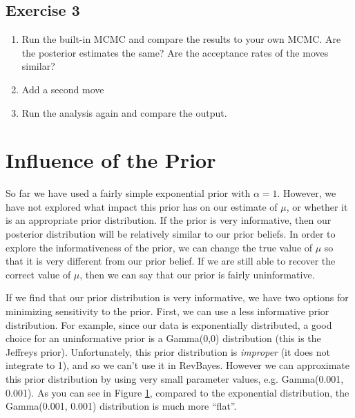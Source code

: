 \subsection{Exercise 3}

\begin{enumerate}[label=\textnormal{Step \arabic*)},leftmargin=1.5cm]
	\item Run the built-in MCMC and compare the results to your own MCMC. Are the posterior estimates the same? Are the acceptance rates of the moves similar?
	\item Add a second move 
	\item Run the analysis again and compare the output.
\end{enumerate}

\section{Influence of the Prior}

So far we have used a fairly simple exponential prior with $\alpha = 1$.
However, we have not explored what impact this prior has on our estimate of $\mu$, or whether it is an appropriate prior distribution.
If the prior is very informative, then our posterior distribution will be relatively similar to our prior beliefs.
In order to explore the informativeness of the prior, we can change the true value of $\mu$ so that it is very different from our prior belief.
If we are still able to recover the correct value of $\mu$, then we can say that our prior is fairly uninformative.

If we find that our prior distribution is very informative, we have two options for minimizing sensitivity to the prior.
First, we can use a less informative prior distribution.
For example, since our data is exponentially distributed, a good choice for an uninformative prior is a Gamma(0,0) distribution (this is the Jeffreys prior).
Unfortunately, this prior distribution is \emph{improper} (it does not integrate to 1), and so we can't use it in RevBayes.
However we can approximate this prior distribution by using very small parameter values, e.g. Gamma(0.001, 0.001).
As you can see in Figure \ref{fig:gamma_distribution}, compared to the exponential distribution, the Gamma(0.001, 0.001) distribution is much more ``flat''.

\begin{figure}[h!]
\centering
{}
\label{fig:gamma_distribution}
\end{figure}

